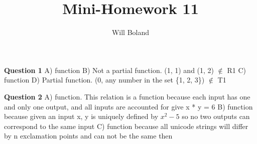 \documentclass{article}
\begin{document}
\title{Mini-Homework 11}
\author{Will Boland}
\maketitle

\textbf{Question 1}\newline
A) function\newline
B) Not a partial function. (1, 1) and (1, 2) $\notin$ R1\newline
C) function\newline
D) Partial function. (0, any number in the set \{1, 2, 3\}) $\notin$ T1\newline\newline

\textbf{Question 2}\newline
A) function. This relation is a function because each input has one and only one output, and all inputs are accounted for give x * y = 6\newline
B) function because given an input x, y is uniquely defined by ${x^2-5}$ so no two outputs can correspond to the same input\newline
C) function because all unicode strings will differ by n exclamation points and can not be the same then

\enddocument
\end{document}
